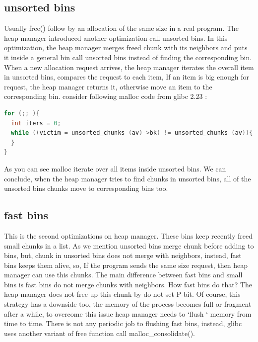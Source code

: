 \documentclass{masterthesis}
\newcommand*\libc{glibc}
\newcommand*\fb{fast bins}
\newcommand*\ub{unsorted bins}
\newcommand*\sbs{small bins}
\begin{document}
\subsection{\ub{}}
Usually free() follow by an allocation of the same size in a real program. The heap manager introduced another optimization call \ub{}. In this optimization, the heap manager merges freed chunk with its neighbors and puts it inside a general bin call \ub{} instead of finding the corresponding bin. When a new allocation request arrives, the heap manager iterates the overall item in \ub{}, compares the request to each item, If an item is big enough for request, the heap manager returns it, otherwise move an item to the corresponding bin. consider following malloc code from \libc{} 2.23 :

\begin{lstlisting}[language=c,frame=tlrb]
for (;; ){
  int iters = 0;
  while ((victim = unsorted_chunks (av)->bk) != unsorted_chunks (av)){
  }
}
\end{lstlisting}

As you can see malloc iterate over all items inside \ub{}. We can conclude, when the heap manager tries to find chunks in \ub{}, all of the \ub{} chunks move to corresponding bins too.

\subsection{\fb{}}
This is the second optimizations on heap manager. These bins keep recently freed small chunks in a list. As we mention \ub{} merge chunk before adding to bins, but, chunk in \ub{} does not merge with neighbors, instead, \fb{} keeps them alive, so, If the program sends the same size request, then heap manager can use this chunks.
The main difference between \fb{} and \sbs{} is \fb{} do not merge chunks with neighbors. How \fb{} do that? The heap manager does not free up this chunk by do not set P-bit. Of course, this strategy has a downside too, the memory of the process becomes full or fragment after a while, to overcome this issue heap manager needs to ‘flush ‘ memory from time to time. There is not any periodic job to flushing \fb{}, instead, \libc{} uses another variant of free function call malloc\_consolidate(). 
\end{document}
